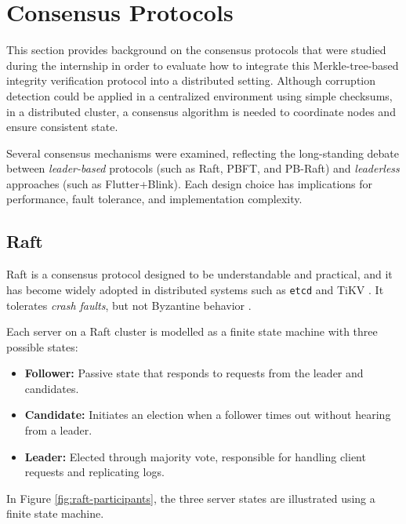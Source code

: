 \section{Consensus Protocols}

This section provides background on the consensus protocols that were studied
during the internship in order to evaluate how to integrate this Merkle-tree-based integrity verification protocol into a distributed setting.  
Although corruption detection could be applied in a centralized environment using simple checksums, in a distributed cluster, a consensus algorithm is needed to coordinate nodes and ensure consistent state.  

Several consensus mechanisms were examined, reflecting the long-standing debate between \emph{leader-based} protocols (such as Raft, PBFT, and PB-Raft) and \emph{leaderless} approaches (such as Flutter+Blink). Each design choice has implications for performance, fault tolerance, and implementation complexity.

\subsection{Raft} \label{sec:raft}

Raft \cite{raft} is a consensus protocol designed to be understandable and practical, and it has become widely adopted in distributed systems such as \texttt{etcd} \cite{etcd-raft} and TiKV \cite{tikv-raft}.
It tolerates \emph{crash faults}, but not Byzantine behavior \cite{lamport1972byzantine}.

Each server on a Raft cluster is modelled as a finite state machine with three possible states:
\begin{itemize}
    \item \textbf{Follower:} Passive state that responds to requests from the leader and candidates.
    \item \textbf{Candidate:} Initiates an election when a follower times out without hearing from a leader.
    \item \textbf{Leader:} Elected through majority vote, responsible for handling client requests and replicating logs.
\end{itemize}

In Figure \ref{fig:raft-participants}, the three server states are illustrated using a finite state machine.

